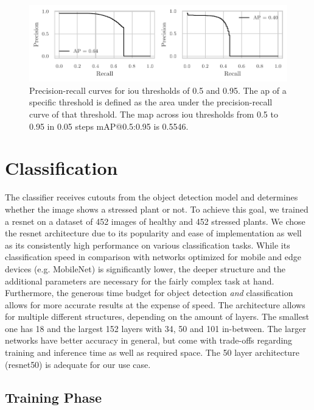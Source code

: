 \documentclass[draft,final]{vutinfth} %
\begin{document}
\begin{figure}
  \centering
  \includegraphics{graphics/APpt5-pt95-final.pdf}
  \caption[Hyper-parameter optimized object detection AP@0.5 and
  AP@0.95.]{Precision-recall curves for \gls{iou} thresholds of 0.5
    and 0.95. The \gls{ap} of a specific threshold is defined as the
    area under the precision-recall curve of that threshold. The
    \gls{map} across \gls{iou} thresholds from 0.5 to 0.95 in 0.05
    steps \textsf{mAP}@0.5:0.95 is 0.5546.}
  \label{fig:yolo-ap-hyp}
\end{figure}

\section{Classification}
\label{sec:classifier-eval}

The classifier receives cutouts from the object detection model and
determines whether the image shows a stressed plant or not. To achieve
this goal, we trained a \gls{resnet} \cite{he2016} on a dataset of 452
images of healthy and 452 stressed plants. We chose the \gls{resnet}
architecture due to its popularity and ease of implementation as well
as its consistently high performance on various classification
tasks. While its classification speed in comparison with networks
optimized for mobile and edge devices (e.g. MobileNet) is
significantly lower, the deeper structure and the additional
parameters are necessary for the fairly complex task at
hand. Furthermore, the generous time budget for object detection
\emph{and} classification allows for more accurate results at the
expense of speed. The architecture allows for multiple different
structures, depending on the amount of layers. The smallest one has 18
and the largest 152 layers with 34, 50 and 101 in-between. The larger
networks have better accuracy in general, but come with trade-offs
regarding training and inference time as well as required space. The
50 layer architecture (\gls{resnet}50) is adequate for our use case.

\subsection{Training Phase}
\label{ssec:classifier-training}
\end{document}

